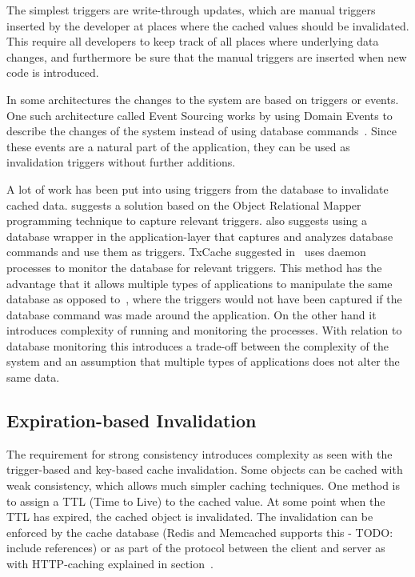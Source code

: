 The simplest triggers are write-through updates, which are manual triggers inserted by the developer at places where the cached values should be invalidated. This require all developers to keep track of all places where underlying data changes, and furthermore be sure that the manual triggers are inserted when new code is introduced.

In some architectures the changes to the system are based on triggers or events. One such architecture called Event Sourcing works by using Domain Events to describe the changes of the system instead of using database commands~\cite{blog:focusing-on-events}. Since these events are a natural part of the application, they can be used as invalidation triggers without further additions.

A lot of work has been put into using triggers from the database to invalidate cached data. \cite{paper:cache-genie} suggests a solution based on the Object Relational Mapper programming technique to capture relevant triggers. \cite{paper:deploy-time} also suggests using a database wrapper in the application-layer that captures and analyzes database commands and use them as triggers. TxCache suggested in~\cite{paper:liskov} uses daemon processes to monitor the database for relevant triggers. This method has the advantage that it allows multiple types of applications to manipulate the same database as opposed to~\cite{paper:cache-genie, paper:deploy-time}, where the triggers would not have been captured if the database command was made around the application. On the other hand it introduces complexity of running and monitoring the processes. With relation to database monitoring this introduces a trade-off between the complexity of the system and an assumption that multiple types of applications does not alter the same data.

\subsection{Expiration-based Invalidation}

The requirement for strong consistency introduces complexity as seen with the trigger-based and key-based cache invalidation. Some objects can be cached with weak consistency, which allows much simpler caching techniques. One method is to assign a TTL (Time to Live) to the cached value. At some point when the TTL has expired, the cached object is invalidated. The invalidation can be enforced by the cache database (Redis and Memcached supports this - TODO: include references) or as part of the protocol between the client and server as with HTTP-caching explained in section~\cite{paper:web-caching-schemes}.

